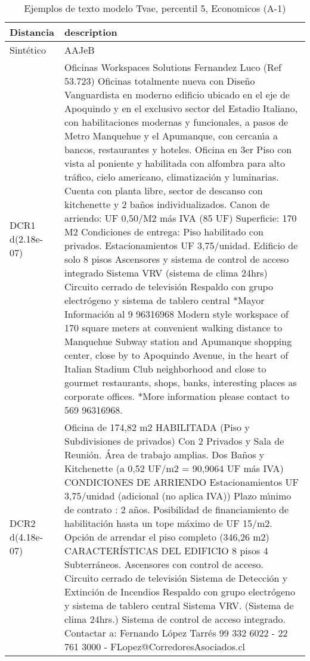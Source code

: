 \begin{table}[H]
\centering
\fontsize{10}{14}\selectfont
\caption{Ejemplos de texto modelo Tvae, percentil 5, Economicos (A-1)}
\label{table-example-economicos-a-1-tvae-5p-text}
\begin{tabular}{|l|m{35em}|}
\hline
\rowcolor[gray]{0.8}
Distancia & description \\
\hline Sintético & AAJeB \\
\hline DCR1 d(2.18e-07) & Oficinas Workspaces Solutions Fernandez Luco (Ref 53.723) Oficinas totalmente nueva con Dise\~no Vanguardista en moderno edificio ubicado en el eje de Apoquindo y en el exclusivo sector del Estadio Italiano, con habilitaciones modernas y funcionales, a pasos de Metro Manquehue y el Apumanque, con cercan{\'\i}a a bancos, restaurantes y hoteles. Oficina en 3er Piso con vista al poniente y habilitada con alfombra para alto tr\'afico, cielo americano, climatizaci\'on y luminarias. Cuenta con planta libre, sector de descanso con kitchenette y 2 ba\~nos individualizados.   Canon de arriendo: UF 0,50/M2 m\'as IVA (85 UF)   Superficie: 170 M2   Condiciones de entrega: Piso habilitado con privados.   Estacionamientos UF 3,75/unidad.   Edificio de solo 8 pisos   Ascensores y sistema de control de acceso integrado   Sistema VRV (sistema de clima 24hrs)   Circuito cerrado de televisi\'on   Respaldo con grupo electr\'ogeno y sistema de tablero central *Mayor Informaci\'on al 9 96316968 Modern style workspace of 170 square meters at convenient walking distance to Manquehue Subway station and Apumanque shopping center, close by to Apoquindo Avenue, in the heart of Italian Stadium Club neighborhood and close to gourmet restaurants, shops, banks, interesting places as corporate offices. *More information please contact to 569 96316968. \\
\hline DCR2 d(4.18e-07) & Oficina de 174,82 m2 HABILITADA (Piso y Subdivisiones de privados)  Con 2 Privados y Sala de Reuni\'on. \'Area de trabajo amplias. Dos Ba\~nos y Kitchenette  (a 0,52 UF/m2 = 90,9064 UF m\'as IVA)  CONDICIONES DE ARRIENDO   Estacionamientos UF 3,75/unidad (adicional (no aplica IVA))   Plazo m{\'\i}nimo de contrato : 2 a\~nos.    Posibilidad de financiamiento de habilitaci\'on hasta un tope m\'aximo de UF 15/m2.  Opci\'on de arrendar el piso completo (346,26 m2)  CARACTER\'ISTICAS DEL EDIFICIO   8 pisos   4 Subterr\'aneos.   Ascensores con control de acceso.   Circuito cerrado de televisi\'on   Sistema de Detecci\'on y Extinci\'on de Incendios   Respaldo con grupo electr\'ogeno y sistema de tablero central   Sistema VRV. (Sistema de clima 24hrs.)   Sistema de control de acceso integrado.  Contactar a: Fernando L\'opez Tarr\'es 99 332 6022 - 22 761 3000 - FLopez@CorredoresAsociados.cl \\
\hline
\end{tabular}
\end{table}
